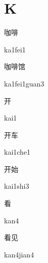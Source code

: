 ﻿%
\section*{K}
\begin{multicols*}{2}

\begin{verbete}[ka1fei1]{咖啡}
\begin{pronuncia}{ka1fei1}
\end{pronuncia}
\end{verbete}

\begin{verbete}{咖啡馆}
\begin{pronuncia}{ka1fei1guan3}
\end{pronuncia}
\end{verbete}

\begin{verbete}[kai1]{开}
\begin{pronuncia}{kai1}
\end{pronuncia}
\end{verbete}

\begin{verbete}{开车}
\begin{pronuncia}{kai1che1}
\end{pronuncia}
\end{verbete}

\begin{verbete}{开始}
\begin{pronuncia}{kai1shi3}
\end{pronuncia}
\end{verbete}

\begin{verbete}[kan4]{看}
\begin{pronuncia}{kan4}
\end{pronuncia}
\end{verbete}

\begin{verbete}{看见}
\begin{pronuncia}{kan4jian4}
\end{pronuncia}
\end{verbete}


\end{multicols*}
